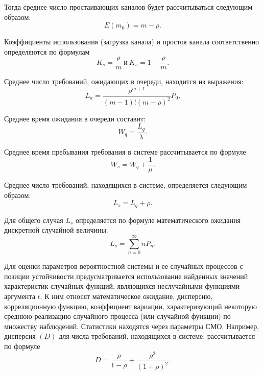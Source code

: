 Тогда среднее число простаивающих каналов будет рассчитываться следующим образом:
\begin{equation}\label{10-14}
E(m_0) = m - \rho.
\end{equation}

Коэффициенты использования (загрузка канала) и простоя канала соответственно определяются по формулам
\begin{equation}\label{10-15}
K_s = \dfrac{\rho}{m}\  \text{и} \ K_s =1- \dfrac{\rho}{m}.
\end{equation}

Среднее число требований, ожидающих в очереди, находится из выражения:
\begin{equation}\label{10-16}
L_a = \dfrac{\rho^{m+1}}{(m-1)!(m-\rho)^2}P_0.
\end{equation}

Среднее время ожидания в очереди составит:
\begin{equation}\label{10-17}
W_q = \dfrac{L_q}{\lambda}.
\end{equation}

Среднее время пребывания требования в системе рассчитывается по формуле
\begin{equation}\label{10-18}
W_s = W_q +\dfrac{1}{\mu}.
\end{equation}

Среднее число требований, находящихся в системе, определяется следующим образом:
\begin{equation}\label{10-19}
L_s =L_q + \rho.
\end{equation}

Для общего случая $L_s$ определяется по формуле математического ожидания дискретной случайной величины:
\begin{equation}\label{10-20}
L_s = \sum\limits_{n=0}^\infty nP_n.
\end{equation}

Для оценки параметров вероятностной системы и ее случайных процессов с позиции устойчивости предусматривается использование найденных значений характеристик случайных функций, являющихся неслучайными функциями аргумента $t$. К ним относят математическое ожидание, дисперсию, корреляционную функцию, коэффициент вариации, характеризующий некоторую среднюю реализацию случайного процесса (или случайной функции) по множеству наблюдений. Статистики находятся через параметры СМО. Например, дисперсия $(D)$ для числа требований, находящихся в системе, рассчитывается по формуле
\begin{equation}\label{10-21}
D = \dfrac{\rho}{1-\rho} + \dfrac{\rho^2}{(1+\rho)^2}.
\end{equation}

